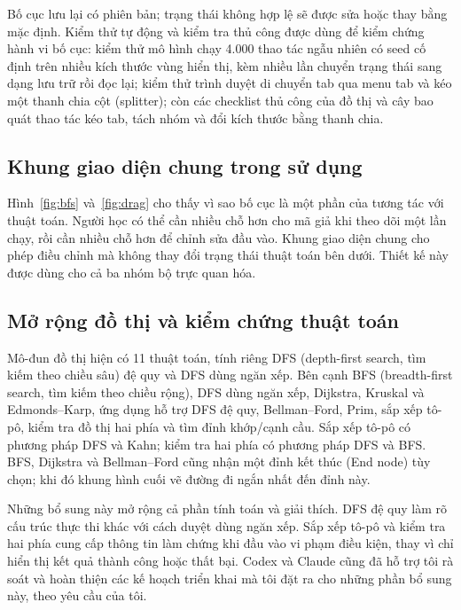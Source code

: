 \documentclass[11pt,a4paper]{article}
\begin{document}
Bố cục lưu lại có phiên bản; trạng thái không hợp lệ sẽ được sửa hoặc thay bằng mặc định. Kiểm thử tự động và kiểm tra thủ công được dùng để kiểm chứng hành vi bố cục: kiểm thử mô hình chạy 4.000 thao tác ngẫu nhiên có seed cố định trên nhiều kích thước vùng hiển thị, kèm nhiều lần chuyển trạng thái sang dạng lưu trữ rồi đọc lại; kiểm thử trình duyệt di chuyển tab qua menu tab và kéo một thanh chia cột (splitter); còn các checklist thủ công của đồ thị và cây bao quát thao tác kéo tab, tách nhóm và đổi kích thước bằng thanh chia.
\FloatBarrier

\subsection{Khung giao diện chung trong sử dụng}

Hình~\ref{fig:bfs} và~\ref{fig:drag} cho thấy vì sao bố cục là một phần của tương tác với thuật toán. Người học có thể cần nhiều chỗ hơn cho mã giả khi theo dõi một lần chạy, rồi cần nhiều chỗ hơn để chỉnh sửa đầu vào. Khung giao diện chung cho phép điều chỉnh mà không thay đổi trạng thái thuật toán bên dưới. Thiết kế này được dùng cho cả ba nhóm bộ trực quan hóa.
\FloatBarrier

\page
\subsection{Mở rộng đồ thị và kiểm chứng thuật toán}
Mô-đun đồ thị hiện có 11 thuật toán, tính riêng DFS (depth-first search, tìm kiếm theo chiều sâu) đệ quy và DFS dùng ngăn xếp. Bên cạnh BFS (breadth-first search, tìm kiếm theo chiều rộng), DFS dùng ngăn xếp, Dijkstra, Kruskal và Edmonds--Karp, ứng dụng hỗ trợ DFS đệ quy, Bellman--Ford, Prim, sắp xếp tô-pô, kiểm tra đồ thị hai phía và tìm đỉnh khớp/cạnh cầu. Sắp xếp tô-pô có phương pháp DFS và Kahn; kiểm tra hai phía có phương pháp DFS và BFS. BFS, Dijkstra và Bellman--Ford cũng nhận một đỉnh kết thúc (End node) tùy chọn; khi đó khung hình cuối vẽ đường đi ngắn nhất đến đỉnh này.

Những bổ sung này mở rộng cả phần tính toán và giải thích. DFS đệ quy làm rõ cấu trúc thực thi khác với cách duyệt dùng ngăn xếp. Sắp xếp tô-pô và kiểm tra hai phía cung cấp thông tin làm chứng khi đầu vào vi phạm điều kiện, thay vì chỉ hiển thị kết quả thành công hoặc thất bại. Codex và Claude cũng đã hỗ trợ tôi rà soát và hoàn thiện các kế hoạch triển khai mà tôi đặt ra cho những phần bổ sung này, theo yêu cầu của tôi.
\end{document}
